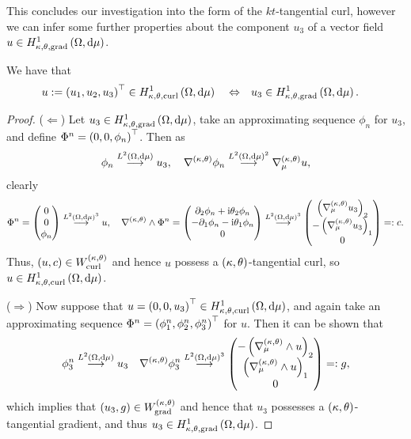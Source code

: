This concludes our investigation into the form of the $kt$-tangential curl, however we can infer some further properties about the component $u_3$ of a vector field $u\in\ktgradSob{\ddom}{\ddmes}$.
\begin{prop} \label{prop:CurlImpliesThirdCompGradient}
	We have that
	\begin{align*}
		u:=\bracs{u_1,u_2,u_3}^\top\in\ktcurlSob{\ddom}{\ddmes}
		\quad\Leftrightarrow\quad &
		u_3\in\ktgradSob{\ddom}{\ddmes}.
	\end{align*}
\end{prop}
\begin{proof}
	($\Leftarrow$) Let $u_3\in\ktgradSob{\ddom}{\ddmes}$, take an approximating sequence $\phi_n$ for $u_3$, and define $\Phi^n=\bracs{0,0,\phi_n}^\top$.
	Then as
	\begin{align*}
		\phi_n \lconv{\ltwo{\ddom}{\ddmes}} u_3, \quad \ktgrad\phi_n \lconv{\ltwo{\ddom}{\ddmes}^2} \ktgrad_{\ddmes}u,
	\end{align*}
	clearly
	\begin{align*}
		\Phi^n = \begin{pmatrix} 0 \\ 0 \\ \phi_n \end{pmatrix} \lconv{\ltwo{\ddom}{\ddmes}^3} u, \quad
		\ktcurl{}\Phi^n = \begin{pmatrix} \partial_2\phi_n + \rmi\qm_2\phi_n \\ -\partial_1\phi_n - \rmi\qm_1\phi_n \\ 0 \end{pmatrix} 
		\lconv{\ltwo{\ddom}{\ddmes}^3} \begin{pmatrix} \bracs{\ktgrad_{\ddmes}u_3}_2 \\ -\bracs{\ktgrad_{\ddmes}u_3}_1 \\ 0	\end{pmatrix} =: c.
	\end{align*}
	Thus, $\bracs{u, c}\in W^{\kt}_{\mathrm{curl}}$ and hence $u$ possess a $\kt$-tangential curl, so $u\in\ktcurlSob{\ddom}{\ddmes}$.
	
	($\Rightarrow$) Now suppose that $u=\bracs{0,0,u_3}^\top\in\ktcurlSob{\ddom}{\ddmes}$, and again take an approximating sequence $\Phi^n = \bracs{\phi^n_1, \phi^n_2, \phi^n_3}^\top$ for $u$.
	Then it can be shown that
	\begin{align*}
		\phi^n_3 \lconv{\ltwo{\ddom}{\ddmes}} u_3
		\quad \ktgrad\phi^n_3 \lconv{\ltwo{\ddom}{\ddmes}^3} \begin{pmatrix} -\bracs{ \ktcurl{\ddmes}u}_2 \\ \bracs{ \ktcurl{\ddmes}u}_1 \\ 0 \end{pmatrix} =: g,
	\end{align*}
	which implies that $\bracs{u_3,g}\in W^{\kt}_{\mathrm{grad}}$ and hence that $u_3$ possesses a $\kt$-tangential gradient, and thus $u_3\in\ktgradSob{\ddom}{\ddmes}$.
\end{proof}
